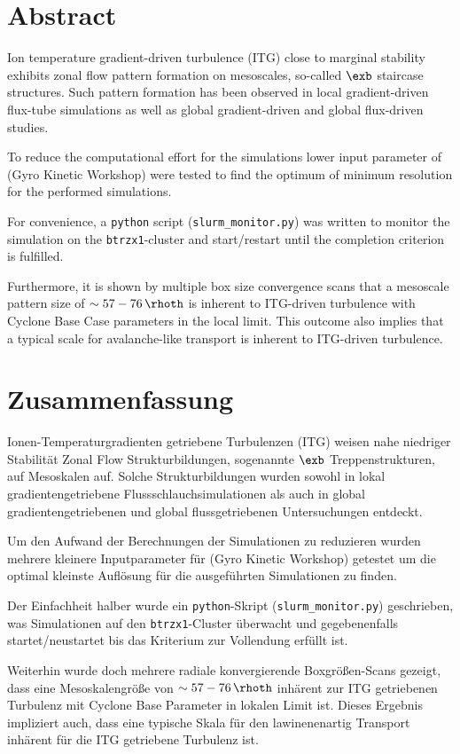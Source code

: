 \chapter*{Abstract}
\label{chap:abstractENG}

Ion temperature gradient-driven turbulence (ITG) close to marginal stability exhibits zonal flow pattern formation on mesoscales, so-called $\exb$ staircase structures. Such pattern formation has been observed in local gradient-driven flux-tube simulations as well as global gradient-driven and global flux-driven studies. \bigskip

To reduce the computational effort for the simulations lower input parameter of \gkw (Gyro Kinetic Workshop) were tested to find the optimum of minimum resolution for the performed simulations. \bigskip

For convenience, a \texttt{python} script (\texttt{slurm\_monitor.py}) was written to monitor the simulation on the \texttt{btrzx1}-cluster and start/restart until the completion criterion is fulfilled. \bigskip

Furthermore, it is shown by multiple box size convergence scans that a mesoscale pattern  size of $\sim 57-76\,\rhoth$ is inherent to ITG-driven turbulence with Cyclone Base Case parameters in the local limit. This outcome also implies that a typical scale for avalanche-like transport is inherent to ITG-driven turbulence.

\chapter*{Zusammenfassung}
\label{chap:abstractDE}

Ionen-Temperaturgradienten getriebene Turbulenzen (ITG) weisen nahe niedriger Stabilität Zonal Flow Strukturbildungen, sogenannte $\exb$ Treppenstrukturen, auf Mesoskalen auf. Solche Strukturbildungen wurden sowohl in lokal gradientengetriebene Flussschlauchsimulationen als auch in global gradientengetriebenen und global flussgetriebenen Untersuchungen entdeckt. \bigskip

Um den Aufwand der Berechnungen der Simulationen zu reduzieren wurden mehrere kleinere Inputparameter für \gkw (Gyro Kinetic Workshop) getestet um die optimal kleinste Auflösung für die ausgeführten Simulationen zu finden. \bigskip

Der Einfachheit halber wurde ein \texttt{python}-Skript (\texttt{slurm\_monitor.py}) geschrieben, was Simulationen auf den \texttt{btrzx1}-Cluster überwacht und gegebenenfalls startet/neustartet bis das Kriterium zur Vollendung erfüllt ist. \bigskip

Weiterhin wurde doch mehrere radiale konvergierende Boxgrößen-Scans gezeigt, dass eine Mesoskalengröße von $\sim 57-76\,\rhoth$ inhärent zur ITG getriebenen Turbulenz mit Cyclone Base Parameter in lokalen Limit ist. Dieses Ergebnis impliziert auch, dass eine typische Skala für den lawinenenartig Transport inhärent für die ITG getriebene Turbulenz ist.